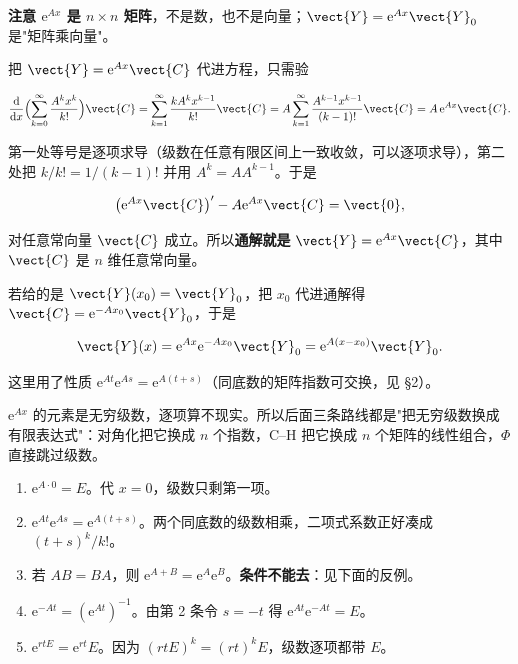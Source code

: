 \documentclass[11pt]{ctexart}
\begin{document}
\textbf{注意 $\mathrm{e}^{Ax}$ 是 $n\times n$ 矩阵}，不是数，也不是向量；$\vect{Y}=\mathrm{e}^{Ax}\vect{Y}_0$ 是"矩阵乘向量"。


把 $\vect{Y}=\mathrm{e}^{Ax}\vect{C}$ 代进方程，只需验

\[
\frac{\mathrm{d}}{\mathrm{d}x}\Bigl(\sum_{k=0}^{\infty}\frac{A^kx^k}{k!}\Bigr)\vect{C}
=\sum_{k=1}^{\infty}\frac{kA^kx^{k-1}}{k!}\vect{C}
=A\sum_{k=1}^{\infty}\frac{A^{k-1}x^{k-1}}{(k-1)!}\vect{C}
=A\,\mathrm{e}^{Ax}\vect{C}.
\]

第一处等号是逐项求导（级数在任意有限区间上一致收敛，可以逐项求导），第二处把 $k/k!=1/(k-1)!$ 并用 $A^k=AA^{k-1}$。于是

\[
\bigl(\mathrm{e}^{Ax}\vect{C}\bigr)'-A\mathrm{e}^{Ax}\vect{C}=\vect{0},
\]

对任意常向量 $\vect{C}$ 成立。所以\textbf{通解就是} $\vect{Y}=\mathrm{e}^{Ax}\vect{C}$，其中 $\vect{C}$ 是 $n$ 维任意常向量。


若给的是 $\vect{Y}(x_0)=\vect{Y}_0$，把 $x_0$ 代进通解得 $\vect{C}=\mathrm{e}^{-Ax_0}\vect{Y}_0$，于是

\[
\vect{Y}(x)=\mathrm{e}^{Ax}\mathrm{e}^{-Ax_0}\vect{Y}_0=\mathrm{e}^{A(x-x_0)}\vect{Y}_0 .
\]

这里用了性质 $\mathrm{e}^{At}\mathrm{e}^{As}=\mathrm{e}^{A(t+s)}$（同底数的矩阵指数可交换，见 §2）。


$\mathrm{e}^{Ax}$ 的元素是无穷级数，逐项算不现实。所以后面三条路线都是"把无穷级数换成有限表达式"：对角化把它换成 $n$ 个指数，C--H 把它换成 $n$ 个矩阵的线性组合，$\Phi$ 直接跳过级数。



\begin{enumerate}
  \item $\mathrm{e}^{A\cdot0}=E$。代 $x=0$，级数只剩第一项。
  \item $\mathrm{e}^{At}\mathrm{e}^{As}=\mathrm{e}^{A(t+s)}$。两个同底数的级数相乘，二项式系数正好凑成 $(t+s)^k/k!$。
  \item 若 $AB=BA$，则 $\mathrm{e}^{A+B}=\mathrm{e}^A\mathrm{e}^B$。\textbf{条件不能去}：见下面的反例。
  \item $\mathrm{e}^{-At}=(\mathrm{e}^{At})^{-1}$。由第 2 条令 $s=-t$ 得 $\mathrm{e}^{At}\mathrm{e}^{-At}=E$。
  \item $\mathrm{e}^{rtE}=\mathrm{e}^{rt}E$。因为 $(rtE)^k=(rt)^kE$，级数逐项都带 $E$。
\end{enumerate}
\end{document}
